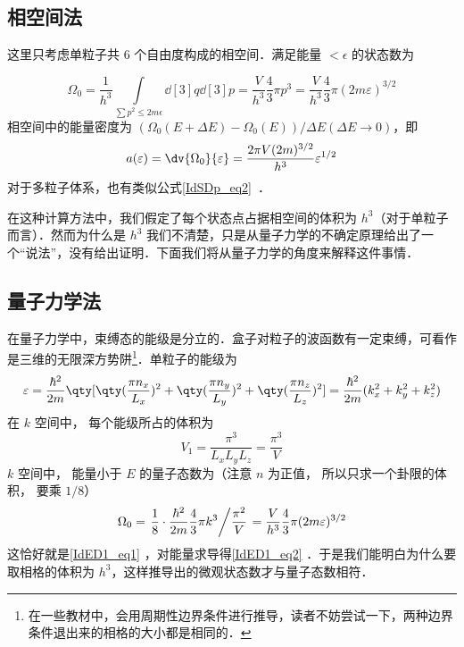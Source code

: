 
\subsection{相空间法}
这里只考虑单粒子共 $6$ 个自由度构成的相空间．满足能量 $<\epsilon$ 的状态数为

\begin{equation}\label{IdED1_eq1}
\Omega_0 = \frac{1}{h^3}\int\limits_{\sum {p^2}  \leqslant 2m\epsilon} \dd[3]{q} \dd[3]{p}
 = \frac{V}{h^3}\frac43 \pi {p^3}
 = \frac{V}{h^3}\frac43 \pi (2m\varepsilon)^{3/2}
\end{equation}
相空间中的能量密度为 $(\Omega_0(E+\Delta E)-\Omega_0(E))/\Delta E(\Delta E\rightarrow 0)$，即
\begin{equation}\label{IdED1_eq2}
a(\varepsilon) = \dv{\Omega_0}{\varepsilon} = \frac{2\pi V(2m)^{3/2}}{h^3} \varepsilon^{1/2}
\end{equation}
对于多粒子体系，也有类似公式\autoref{IdSDp_eq2}~．

在这种计算方法中，我们假定了每个状态点占据相空间的体积为 $h^3$（对于单粒子而言）．然而为什么是 $h^3$ 我们不清楚，只是从量子力学的不确定原理给出了一个“说法”，没有给出证明．下面我们将从量子力学的角度来解释这件事情．
\subsection{量子力学法}
在量子力学中，束缚态的能级是分立的．盒子对粒子的波函数有一定束缚，可看作是三维的无限深方势阱\footnote{在一些教材中，会用周期性边界条件进行推导，读者不妨尝试一下，两种边界条件退出来的相格的大小都是相同的．}．单粒子的能级为
\begin{equation}
\varepsilon = \frac{\hbar ^2}{2m} \qty[\qty(\frac{\pi n_x}{L_x})^2 + \qty(\frac{\pi n_y}{L_y})^2 + \qty(\frac{\pi n_z}{L_z})^2] = \frac{\hbar ^2}{2m} (k_x^2 + k_y^2 + k_z^2)
\end{equation}
在 $k$ 空间中， 每个能级所占的体积为
\begin{equation}
V_1 = \frac{\pi^3}{L_x L_y L_z} = \frac{\pi^3}{V}
\end{equation}
$k$ 空间中， 能量小于 $E$ 的量子态数为（注意 $n$ 为正值， 所以只求一个卦限的体积， 要乘 $1/8$）
\begin{equation}
\Omega_0 = \left. \frac18\cdot \frac{\hbar^2}{2m}\frac43 \pi k^3 \middle/ \frac{\pi^2}{V} \right. = \frac{V}{h^3}\frac43 \pi(2m\varepsilon)^{3/2}
\end{equation}
这恰好就是\autoref{IdED1_eq1} ，对能量求导得\autoref{IdED1_eq2} ．于是我们能明白为什么要取相格的体积为 $h^3$，这样推导出的微观状态数才与量子态数相符．
